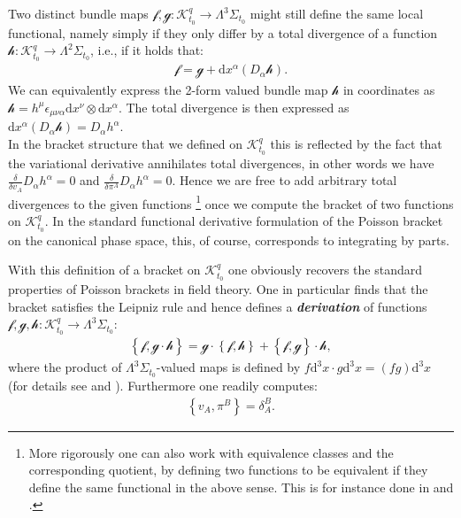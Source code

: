 Two distinct bundle maps $\mathcal{f},\mathcal{g} : \mathcal{K}^q_{t_0} \rightarrow \Lambda^3\Sigma_{t_0}$ might still define the same local functional, namely simply if they only differ by a total divergence of a function $\mathcal{h}: \mathcal{K}^q_{t_0} \rightarrow \Lambda^2\Sigma_{t_0}$, i.e., if it holds that:
\begin{align}
\mathcal{f} = \mathcal{g} +\mathrm{d}x^{\alpha}(D_{\alpha} \mathcal{h}).
\end{align}
We can equivalently express the 2-form valued bundle map $\mathcal{h}$ in coordinates as $\mathcal{h} = h^{\mu} \epsilon_{\mu \nu \alpha} \mathrm{d}x^{\nu} \otimes \mathrm{d}x^{\alpha}$. The total divergence is then expressed as $\mathrm{d}x^{\alpha}(D_{\alpha} \mathcal{h}) = D_{\alpha} h^{\alpha}$. \\
In the bracket structure that we defined on $\mathcal{K}^q_{t_0}$ this is reflected by the fact that the variational derivative annihilates total divergences, in other words we have $\frac{\delta}{\delta v_A}D_{\alpha} h^{\alpha} = 0$ and $\frac{\delta}{\delta \pi^A}D_{\alpha} h^{\alpha}=0$. Hence we are free to add arbitrary total divergences to the given functions \footnote{More rigorously one can also work with equivalence classes and the corresponding quotient, by defining two functions to be equivalent if they define the same functional in the above sense. This is for instance done in \cite{1997hep.th....9164B} and \cite{Barnich1998}.} once we compute the bracket of two functions on $\mathcal{K}^q_{t_0}$. In the standard functional derivative formulation of the Poisson bracket on the canonical phase space, this, of course, corresponds to integrating by parts. 

With this definition of a bracket on $\mathcal{K}^q_{t_0}$ one obviously recovers the standard properties of Poisson brackets in field theory.
One in particular finds that the bracket satisfies the Leipniz rule and hence defines a \textit{\textbf{derivation}} of functions $\mathcal{f},\mathcal{g},\mathcal{h} : \mathcal{K}^q_{t_0} \rightarrow \Lambda^3\Sigma_{t_0}$:
\begin{align}
\left \{\mathcal{f}, \mathcal{g}\cdot \mathcal{h} \right \} = \mathcal{g} \cdot \left \{ \mathcal{f}, \mathcal{h} \right \} + \left \{ \mathcal{f} , \mathcal{g}\right \} \cdot \mathcal{h},
\end{align}
where the product of $\Lambda^3\Sigma_{t_0}$-valued maps is defined by $f \mathrm{d}^3x \cdot g\mathrm{d}^3x = (fg)\mathrm{d}^3x$ (for details see \cite{1997hep.th....9164B} and \cite{Barnich1998}). Furthermore one readily computes: 
\begin{align}
\left \{ v_A, \pi^B\right \} = \delta_A^B.
\end{align}

